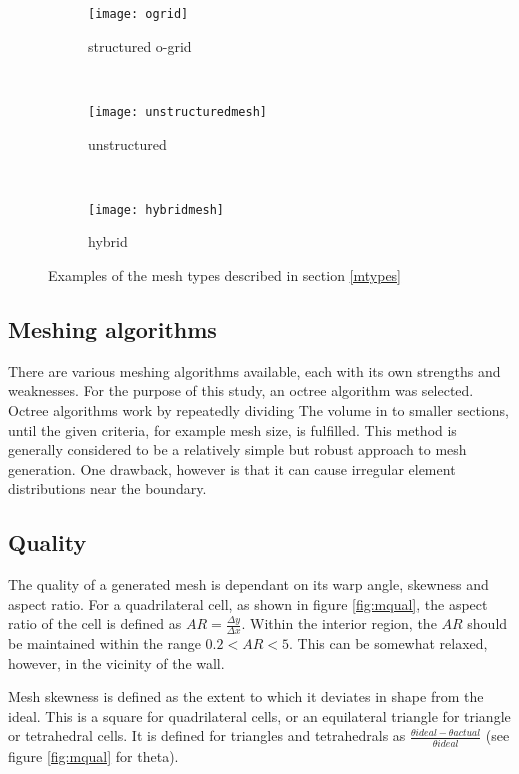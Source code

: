 \begin{figure}
  \begin{subfigure}[t]{0.3\textwidth}
    \texttt{[image: ogrid]}
      \caption{structured o-grid}
    \label{strucmesh}
  \end{subfigure}%
  ~%
  \begin{subfigure}[t]{0.3\textwidth}
    \texttt{[image: unstructuredmesh]}
    \caption{unstructured}
    \label{unstrucmesh}
  \end{subfigure}%
  ~%
  \begin{subfigure}[t]{0.3\textwidth}
    \texttt{[image: hybridmesh]}
    \caption{hybrid}
    \label{unstrucmesh}
  \end{subfigure}

  \caption{Examples of the mesh types described in section \ref{mtypes}} 
  \label{fig:struct}
\end{figure}

\subsection{Meshing algorithms}
There are various meshing algorithms available, each with its own strengths and weaknesses. For the purpose of this study, an octree algorithm was selected. Octree algorithms work by repeatedly dividing The volume in to smaller sections, until the given criteria, for example mesh size, is fulfilled. This method is generally considered to be a relatively simple but robust approach to mesh generation. One drawback, however is that it can cause irregular element distributions near the boundary.

\subsection{Quality}

The quality of a generated mesh is dependant on its warp angle, skewness and aspect ratio. For a quadrilateral cell, as shown in figure \ref{fig:mqual}, the aspect ratio of the cell is defined as $AR = \frac{\Delta y} {\Delta x}$. Within the interior region, the $AR$ should be maintained within the range $0.2 < AR < 5$. This can be somewhat relaxed, however, in the vicinity of the wall.

Mesh skewness is defined as the extent to which it deviates in shape from the ideal. This is a square for quadrilateral cells, or an equilateral triangle for triangle or tetrahedral cells. It is defined for triangles and tetrahedrals as $\frac{\theta ideal - \theta actual} {\theta ideal}$ (see figure \ref{fig:mqual} for theta).

